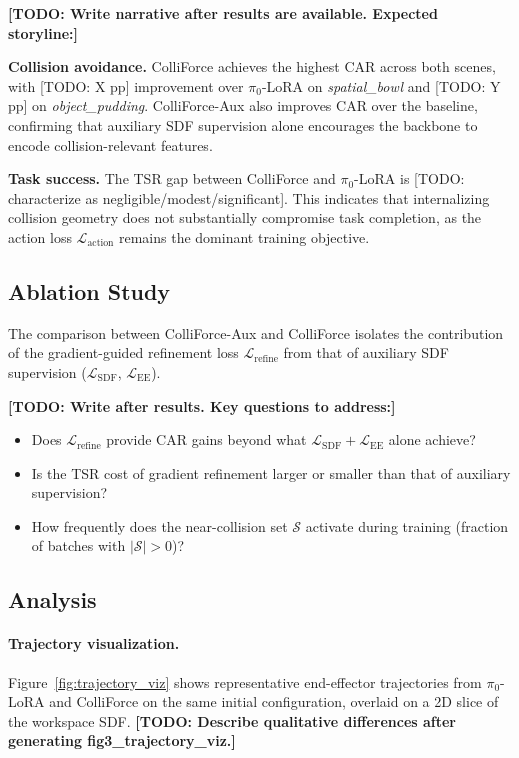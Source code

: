 \textbf{[TODO: Write narrative after results are available. Expected storyline:]}

\textbf{Collision avoidance.} ColliForce achieves the highest CAR across both scenes, with [TODO: X pp] improvement over $\pi_0$-LoRA on \textit{spatial\_bowl} and [TODO: Y pp] on \textit{object\_pudding}. ColliForce-Aux also improves CAR over the baseline, confirming that auxiliary SDF supervision alone encourages the backbone to encode collision-relevant features.

\textbf{Task success.} The TSR gap between ColliForce and $\pi_0$-LoRA is [TODO: characterize as negligible/modest/significant]. This indicates that internalizing collision geometry does not substantially compromise task completion, as the action loss $\mathcal{L}_\mathrm{action}$ remains the dominant training objective.

\subsection{Ablation Study}\label{sec:ablation}

The comparison between ColliForce-Aux and ColliForce isolates the contribution of the gradient-guided refinement loss $\mathcal{L}_\mathrm{refine}$ from that of auxiliary SDF supervision ($\mathcal{L}_\mathrm{SDF}$, $\mathcal{L}_\mathrm{EE}$).

\textbf{[TODO: Write after results. Key questions to address:]}
\begin{itemize}
    \item Does $\mathcal{L}_\mathrm{refine}$ provide CAR gains beyond what $\mathcal{L}_\mathrm{SDF} + \mathcal{L}_\mathrm{EE}$ alone achieve?
    \item Is the TSR cost of gradient refinement larger or smaller than that of auxiliary supervision?
    \item How frequently does the near-collision set $\mathcal{S}$ activate during training (fraction of batches with $|\mathcal{S}| > 0$)?
\end{itemize}

\subsection{Analysis}\label{sec:analysis}

\paragraph{Trajectory visualization.} Figure~\ref{fig:trajectory_viz} shows representative end-effector trajectories from $\pi_0$-LoRA and ColliForce on the same initial configuration, overlaid on a 2D slice of the workspace SDF. \textbf{[TODO: Describe qualitative differences after generating fig3\_trajectory\_viz.]}


